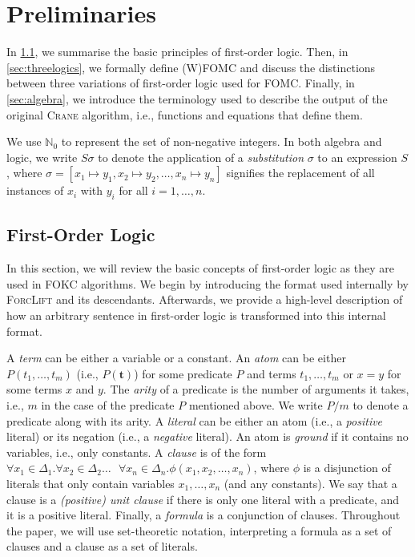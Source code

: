 \documentclass[a4paper,UKenglish,cleveref, autoref, thm-restate]{lipics-v2021}
\begin{document}
\section{Preliminaries}\label{sec:preliminaries}

In \cref{sec:logic}, we summarise the basic principles of first-order logic.
Then, in \cref{sec:threelogics}, we formally define (W)FOMC and discuss the
distinctions between three variations of first-order logic used for FOMC.\@
Finally, in \cref{sec:algebra}, we introduce the terminology used to describe
the output of the original \textsc{Crane} algorithm, i.e., functions and
equations that define them.

We use $\mathbb{N}_{0}$ to represent the set of non-negative integers. In both
algebra and logic, we write $S\sigma$ to denote the application of a
\emph{substitution} $\sigma$ to an expression $S$, where
$\sigma = [x_{1} \mapsto y_{1}, x_{2} \mapsto y_{2}, \dots, x_{n} \mapsto y_{n}]$
signifies the replacement of all instances of $x_{i}$ with $y_{i}$ for all
$i = 1, \dots, n$.

\subsection{First-Order Logic}\label{sec:logic}

In this section, we will review the basic concepts of first-order logic as they
are used in FOKC algorithms. We begin by introducing the format used internally
by \textsc{ForcLift} and its descendants. Afterwards, we provide a high-level
description of how an arbitrary sentence in first-order logic is transformed
into this internal format.

A \emph{term} can be either a variable or a constant. An \emph{atom} can be
either $P(t_{1}, \dots, t_{m})$ (i.e., $P(\mathbf{t})$) for some predicate $P$
and terms $t_{1}, \dots, t_{m}$ or $x=y$ for some terms $x$ and $y$. The
\emph{arity} of a predicate is the number of arguments it takes, i.e., $m$ in
the case of the predicate $P$ mentioned above. We write $P/m$ to denote a
predicate along with its arity. A \emph{literal} can be either an atom (i.e., a
\emph{positive} literal) or its negation (i.e., a \emph{negative} literal). An
atom is \emph{ground} if it contains no variables, i.e., only constants. A
\emph{clause} is of the form $\forall x_{1} \in \Delta_{1}\text{.
}\forall x_{2} \in \Delta_{2}\dots\text{ }\forall x_{n} \in \Delta_{n}\text{.
}\phi(x_{1}, x_{2}, \dots, x_{n})$, where $\phi$ is a disjunction of literals
that only contain variables $x_{1}, \dots, x_{n}$ (and any constants). We say
that a clause is a \emph{(positive) unit clause} if there is only one literal
with a predicate, and it is a positive literal. Finally, a \emph{formula} is a
conjunction of clauses. Throughout the paper, we will use set-theoretic
notation, interpreting a formula as a set of clauses and a clause as a set of
literals.
\end{document}
